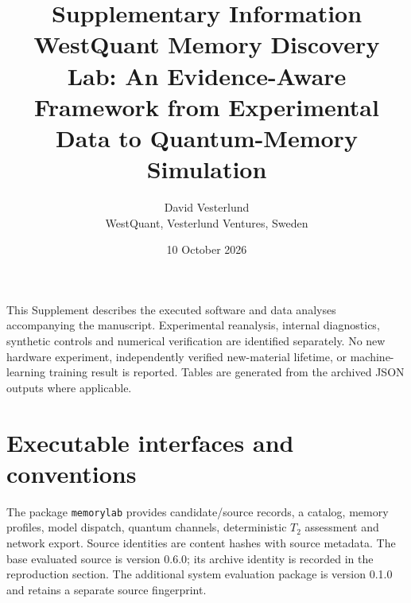 \documentclass[10pt,a4paper]{article}
\title{Supplementary Information\\\large WestQuant Memory Discovery Lab: An Evidence-Aware Framework from Experimental Data to Quantum-Memory Simulation}
\author{David Vesterlund\\\small WestQuant, Vesterlund Ventures, Sweden}
\date{10 October 2026}
\newcommand{\code}[1]{\texttt{#1}}
\begin{document}
\maketitle
\noindent This Supplement describes the executed software and data analyses accompanying the manuscript. Experimental reanalysis, internal diagnostics, synthetic controls and numerical verification are identified separately. No new hardware experiment, independently verified new-material lifetime, or machine-learning training result is reported. Tables are generated from the archived JSON outputs where applicable.

\section{Executable interfaces and conventions}
The package \code{memorylab} provides candidate/source records, a catalog, memory profiles, model dispatch, quantum channels, deterministic $T_2$ assessment and network export. Source identities are content hashes with source metadata. The base evaluated source is version 0.6.0; its archive identity is recorded in the reproduction section. The additional system evaluation package is version 0.1.0 and retains a separate source fingerprint.
\end{document}
